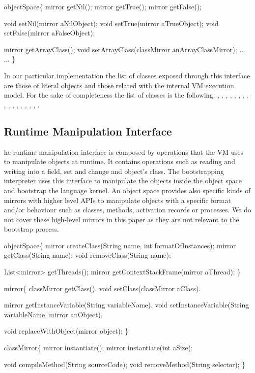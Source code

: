 \begin{code}
objectSpace\{
    mirror getNil();
    mirror getTrue();
    mirror getFalse();

    void setNil(mirror aNilObject);
    void setTrue(mirror aTrueObject);
    void setFalse(mirror aFalseObject);
    
    mirror getArrayClass();
    void setArrayClass(classMirror anArrayClassMirror);
    ...
    ...
\}
\end{code}

In our particular implementation the list of classes exposed through this interface are those of literal objects and those related with the internal VM execution model. For the sake of completeness the list of classes is the following: , , , , , , , , , , , , , , , , .

\subsection{Runtime Manipulation Interface} he runtime manipulation interface is composed by operations that the VM uses to manipulate objects at runtime. It contains operations such as reading and writing into a field, set and change and object's class. The bootstrapping interpreter uses this interface to manipulate the objects inside the object space and bootstrap the language kernel. An object space provides also specific kinds of mirrors with higher level APIs to manipulate objects with a specific format and/or behaviour such as classes, methods, activation records or processes. We do not cover these high-level mirrors in this paper as they are not relevant to the bootstrap process.

\begin{code}
objectSpace\{
    mirror createClass(String name, int formatOfInstances);
    mirror getClass(String name);
    void removeClass(String name);
    
    List<mirror> getThreads();
    mirror getContextStackFrame(mirror aThread);
\}

mirror\{
    classMirror getClass().
    void setClass(classMirror aClass).

    mirror getInstanceVariable(String variableName).
    void setInstanceVariable(String variableName, mirror anObject).
    
    void replaceWithObject(mirror object);
\}

classMirror\{
    mirror instantiate();
    mirror instantiate(int aSize);
    
    void compileMethod(String sourceCode);
    void removeMethod(String selector);
\}
\end{code}

